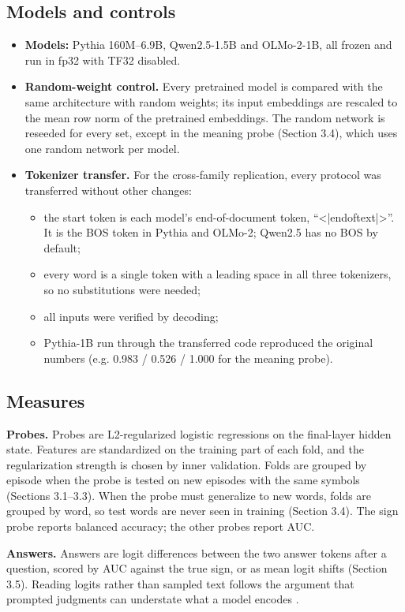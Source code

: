 \documentclass[11pt]{article}
\begin{document}
\subsection{Models and controls}

\begin{itemize}
\item \textbf{Models:} Pythia 160M--6.9B, Qwen2.5-1.5B and OLMo-2-1B, all frozen and run in fp32 with TF32 disabled.
\item \textbf{Random-weight control.} Every pretrained model is compared with the same architecture with random weights; its input embeddings are rescaled to the mean row norm of the pretrained embeddings. The random network is reseeded for every set, except in the meaning probe (Section 3.4), which uses one random network per model.
\item \textbf{Tokenizer transfer.} For the cross-family replication, every protocol was transferred without other changes:
\begin{itemize}
\item the start token is each model's end-of-document token, ``<|endoftext|>''. It is the BOS token in Pythia and OLMo-2; Qwen2.5 has no BOS by default;
\item every word is a single token with a leading space in all three tokenizers, so no substitutions were needed;
\item all inputs were verified by decoding;
\item Pythia-1B run through the transferred code reproduced the original numbers (e.g. 0.983 / 0.526 / 1.000 for the meaning probe).
\end{itemize}
\end{itemize}

\subsection{Measures}

\textbf{Probes.} Probes are L2-regularized logistic regressions on the final-layer hidden state. Features are standardized on the training part of each fold, and the regularization strength is chosen by inner validation. Folds are grouped by episode when the probe is tested on new episodes with the same symbols (Sections 3.1--3.3). When the probe must generalize to new words, folds are grouped by word, so test words are never seen in training (Section 3.4). The sign probe reports balanced accuracy; the other probes report AUC.

\textbf{Answers.} Answers are logit differences between the two answer tokens after a question, scored by AUC against the true sign, or as mean logit shifts (Section 3.5). Reading logits rather than sampled text follows the argument that prompted judgments can understate what a model encodes \citep{hu2023}.
\end{document}
